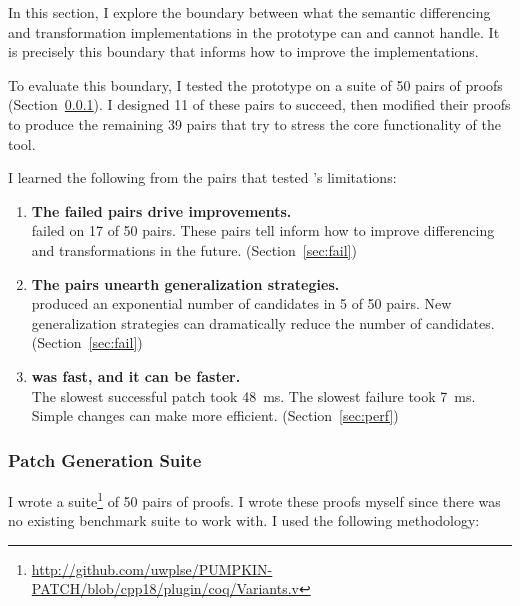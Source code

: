 \lstset{language=coq, aboveskip=3pt,belowskip=3pt}

In this section, I explore the boundary between what the semantic differencing
and transformation implementations in the \sysname prototype can and cannot handle.
It is precisely this boundary that informs how to improve the implementations.

To evaluate this boundary, I tested the \sysname prototype on a suite of 50 pairs of proofs (Section~\ref{sec:suite}).
I designed 11 of these pairs to succeed, then modified their proofs to produce the remaining 39 pairs
that try to stress the core functionality of the tool.

I learned the following from the pairs
that tested \sysname's limitations:

\begin{enumerate}
\item \textbf{The failed pairs drive improvements.} \\
\sysname failed on 17 of 50 pairs. These pairs tell inform how to improve differencing and transformations in the future. (Section~\ref{sec:fail})
\item \textbf{The pairs unearth generalization strategies.} \\
\sysname produced an exponential number of candidates in 5 of 50 pairs.
New generalization strategies can dramatically reduce the number of candidates. (Section~\ref{sec:fail})
\item \textbf{\sysname was fast, and it can be faster.} \\
The slowest successful patch took \SI{48}{\ms}. The slowest failure took \SI{7}{\ms}.
Simple changes can make \sysname more efficient. (Section~\ref{sec:perf})
\end{enumerate}

\subsubsection{Patch Generation Suite}
\label{sec:suite}

I wrote a suite\footnote{\url{http://github.com/uwplse/PUMPKIN-PATCH/blob/cpp18/plugin/coq/Variants.v}} of 50 pairs of proofs. %
I wrote these proofs myself since there was no existing benchmark suite to work with.
I used the following methodology:

